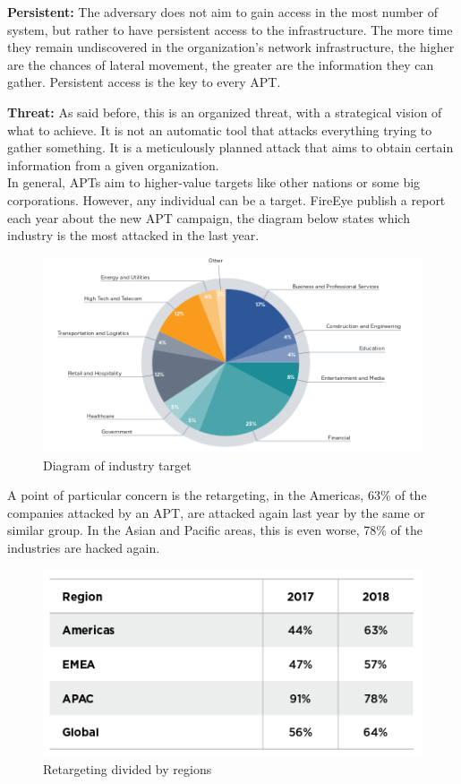 \textbf{Persistent:}  The adversary does not aim to gain access in the most number of system, but rather to have persistent access to the infrastructure. The more time they remain undiscovered in the organization's network infrastructure, the higher are the chances of lateral movement, the greater are the information they can gather. Persistent access is the key to every APT.

\textbf{Threat:} As said before, this is an organized threat, with a strategical vision of what to achieve. It is not an automatic tool that attacks everything trying to gather something. It is a meticulously planned attack that aims to obtain certain information from a given organization. \cite{apt_def}
\\

In general, APTs aim to higher-value targets like other nations or some big corporations. However, any individual can be a target. FireEye publish a report each year about the new APT campaign, the diagram below states which industry is the most attacked in the last year.\\

\begin{figure}[!h]
	\centering
	\includegraphics[width=1.0\columnwidth]{graph}
	\caption{Diagram of industry target}
\end{figure}

A point of particular concern is the retargeting, in the Americas, 63\% of the companies attacked by an APT, are attacked again last year by the same or similar group. In the Asian and Pacific areas, this is even worse, 78\% of the industries are hacked again. \cite{fireeye_mtrends} \\


\begin{figure}[ht!]
	\centering
	\includegraphics[width=0.5\columnwidth]{retarget}
	\caption{Retargeting divided by regions}
\end{figure}

